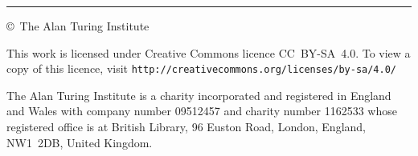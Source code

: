 \documentclass{article}
\begin{document}
\begin{titlepage}
\raggedright\setlength{\parindent}{0pt}%
\vspace*{5\turingcolht}

\begin{minipage}{9\turingcolwd}
\raggedright{}\fontsize{8}{11}\selectfont%
\selectfont%
\rule{4\turingcolwd}{1pt}

\copyright\ The Alan Turing Institute \reportCopyrightDate\relax
\medskip

\selectfont

This work is licensed under Creative Commons licence
CC~BY-SA~4.0. To view a copy of this licence, visit
\fontsize{7.5}{11}\selectfont
\texttt{http://creativecommons.org/licenses/by-sa/4.0/}
\medskip

The Alan Turing Institute is a charity incorporated and registered in
England and Wales with company number 09512457 and charity number
1162533 whose registered office is at British Library, 96 Euston Road,
London, England, NW1~2DB, United Kingdom.
\end{minipage}
\end{titlepage}
\end{document}
